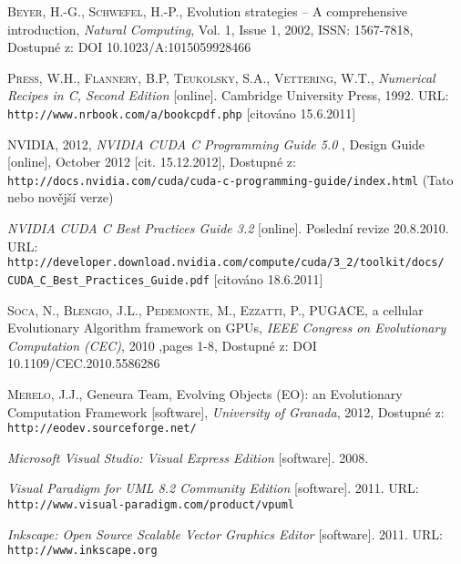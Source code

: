 \begin{thebibliography}{99}
        \textsc{Beyer}, H.-G., \textsc{Schwefel}, H.-P., Evolution strategies -- A comprehensive introduction, \textit{Natural Computing}, Vol. 1, Issue 1, 2002, ISSN: 1567-7818, Dostupné z: DOI 10.1023/A:1015059928466

        \textsc{Press}, W.H., \textsc{Flannery}, B.P, \textsc{Teukolsky}, S.A., \textsc{Vettering}, W.T.,
        \textit{Numerical Recipes in C, Second Edition} [online]. Cambridge University Press, 1992.
        URL: {\tt http://www.nrbook.com/a/bookcpdf.php} [citováno 15.6.2011]

        NVIDIA, 2012, \textit{NVIDIA CUDA C Programming Guide 5.0} , Design Guide [online], October 2012 [cit. 15.12.2012], Dostupné z: \texttt{http://docs.nvidia.com/cuda/cuda-c-programming-guide/index.html} (Tato nebo novější verze)

        \textit{NVIDIA CUDA C Best Practices Guide 3.2} [online]. Poslední revize 20.8.2010.
        URL: {\tt  http://developer.download.nvidia.com/compute/cuda/3\_2/toolkit/docs/} {\tt CUDA\_C\_Best\_Practices\_Guide.pdf} [citováno 18.6.2011]
        
        \textsc{Soca}, N., \textsc{Blengio}, J.L., \textsc{Pedemonte}, M., \textsc{Ezzatti}, P., PUGACE, a cellular Evolutionary Algorithm framework on GPUs, \textit{IEEE Congress on Evolutionary Computation (CEC)}, 2010 ,pages 1-8, Dostupné z: DOI 10.1109/CEC.2010.5586286
        
        \textsc{Merelo}, J.J., Geneura Team, Evolving Objects (EO): an Evolutionary Computation Framework [software], \textit{University of Granada}, 2012, Dostupné z: \texttt{http://eodev.sourceforge.net/}

        \textit{Microsoft Visual Studio: Visual  Express Edition} [software]. 2008.

        \textit{Visual Paradigm for UML 8.2 Community Edition} [software]. 2011.
         URL: {\tt http://www.visual-paradigm.com/product/vpuml}

        \textit{Inkscape: Open Source Scalable Vector Graphics Editor} [software]. 2011.
         URL: {\tt http://www.inkscape.org}

\end{thebibliography} 